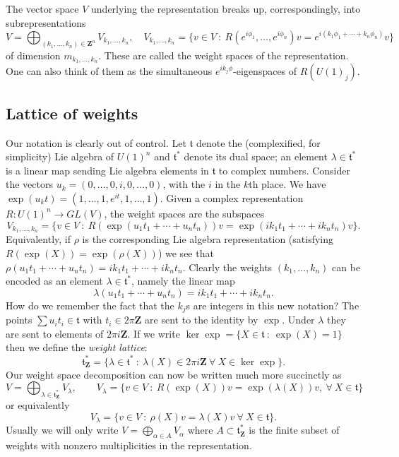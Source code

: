 \documentclass[12pt]{article}
\newcommand{\ZZ}{\mathbf{Z}}
\theoremstyle{definition}
\theoremstyle{check}
\theoremstyle{remark}
\theoremstyle{TheoremNum}
\begin{document}
The vector space $V$ underlying the representation breaks up, correspondingly, into subrepresentations
\[V=\bigoplus_{(k_1,\ldots,k_n)\in\ZZ^n}V_{k_1,\ldots,k_n},\quad V_{k_1,\ldots,k_n}=\{v\in V\ :\ R(e^{i\phi_1},\ldots,e^{i\phi_n})v=e^{i(k_1\phi_1+\cdots+k_n\phi_n)}v\}\]
of dimension $m_{k_1,\ldots,k_n}$. These are called the weight spaces of the representation. One can also think of them as the simultaneous $e^{ik_j\phi}$-eigenspaces of $R(U(1)_j)$.

\subsection{Lattice of weights}

Our notation is clearly out of control. Let $\mathfrak{t}$ denote the (complexified, for simplicity) Lie algebra of $U(1)^n$ and $\mathfrak{t}^*$ denote its dual space; an element $\lambda\in\mathfrak{t}^*$ is a linear map sending Lie algebra elements in $\mathfrak{t}$ to complex numbers. Consider the vectors $u_k=(0,\ldots,0,i,0,\ldots,0)$, with the $i$ in the $k$th place. We have $\exp(u_kt)=(1,\ldots,1,e^{it},1,\ldots,1)$. Given a complex representation $R\colon U(1)^n\to GL(V)$, the weight spaces are the subspaces
\[V_{k_1,\ldots,k_n}=\{v\in V\ :\ R(\exp(u_1t_1+\cdots+u_nt_n))v=\exp(ik_1t_1+\cdots+ik_nt_n)v\}.\]
Equivalently, if $\rho$ is the corresponding Lie algebra representation (satisfying $R(\exp(X))=\exp(\rho(X))$) we see that $\rho(u_1t_1+\cdots+u_nt_n)=ik_1t_1+\cdots+ik_nt_n$. Clearly the weights $(k_1,\ldots,k_n)$ can be encoded as an element $\lambda\in\mathfrak{t}^*$, namely the linear map
\[\lambda(u_1t_1+\cdots+u_nt_n)=ik_1t_1+\cdots+ik_nt_n.\]
How do we remember the fact that the $k_j$s are integers in this new notation? The points $\sum u_it_i\in\mathfrak{t}$ with $t_i\in 2\pi\ZZ$ are sent to the identity by $\exp$. Under $\lambda$ they are sent to elements of $2\pi i\ZZ$. If we write $\ker\exp=\{X\in\mathfrak{t}\ :\ \exp(X)=1\}$ then we define the {\em weight lattice}:
\[\mathfrak{t}^*_{\ZZ}=\{\lambda\in\mathfrak{t}^*\ :\ \lambda(X)\in 2\pi i\ZZ\ \forall\ X\in\ker\exp\}.\]
Our weight space decomposition can now be written much more succinctly as
\[V=\bigoplus_{\lambda\in\mathfrak{t}^*_{\ZZ}}V_{\lambda},\qquad V_{\lambda}=\{v\in V\ :\ R(\exp(X))v=\exp(\lambda(X))v,\ \forall\ X\in\mathfrak{t}\}\]
or equivalently
\[V_{\lambda}=\{v\in V\ :\ \rho(X)v=\lambda(X)v\ \forall\ X\in\mathfrak{t}\}.\]
Usually we will only write $V=\bigoplus_{\alpha\in A}V_{\alpha}$ where $A\subset\mathfrak{t}^*_{\ZZ}$ is the finite subset of weights with nonzero multiplicities in the representation.
\end{document}
